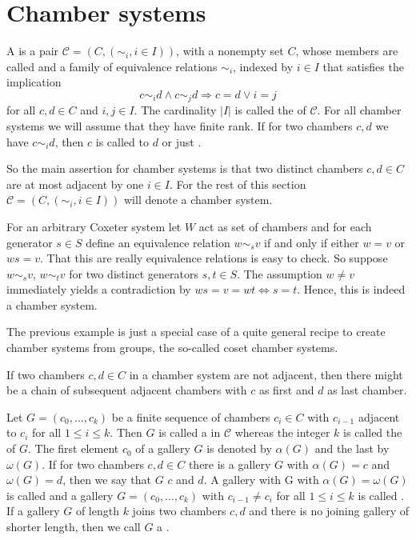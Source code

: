 \section{Chamber systems}

\begin{defi}
	A  is a pair $\mathcal{C} = (C,(\sim_i, i \in I))$, with a nonempty set $C$, whose members are called  and a family of equivalence relations $\sim_i$, indexed by $i \in I$ that satisfies the implication
	$$ c \sim_i d \wedge c \sim_j d \Rightarrow c = d \vee i = j $$
	for all $c,d \in C$ and $i,j \in I$. The cardinality $|I|$ is called the  of $\mathcal{C}$. For all chamber systems we will assume that they have finite rank. If for two chambers $c,d$ we have $c \sim_i d$, then $c$ is called  to $d$ or just .
\end{defi}

So the main assertion for chamber systems is that two distinct chambers $c,d \in C$ are at most adjacent by one $i \in I$. For the rest of this section $\mathcal{C} = (C,(\sim_i, i \in I))$ will denote a chamber system.

\begin{exam}
	For an arbitrary Coxeter system let $W$ act as set of chambers and for each generator $s \in S$ define an equivalence relation $w \sim_s v$ if and only if either $w = v$ or $ws = v$. That this are really equivalence relations is easy to check. So suppose $w \sim_s v$, $w \sim_t v$ for two distinct generators $s,t \in S$. The assumption $w \neq v$ immediately yields a contradiction by $ws = v = wt \iff s = t$. Hence, this is indeed a chamber system.
\end{exam}

The previous example is just a special case of a quite general recipe to create chamber systems from groups, the so-called coset chamber systems.

If two chambers $c,d \in C$ in a chamber system are not adjacent, then there might be a chain of subsequent adjacent chambers with $c$ as first and $d$ as last chamber.

\begin{defi}
	Let $G = (c_0,\ldots,c_k)$ be a finite sequence of chambers $c_i \in C$ with $c_{i-1}$ adjacent to $c_i$ for all $1 \leq i \leq k$. Then $G$ is called a  in $\mathcal{C}$ whereas the integer $k$ is called the  of $G$. The first element $c_0$ of a gallery $G$ is denoted by $\alpha(G)$ and the last by $\omega(G)$. If for two chambers $c,d \in C$ there is a gallery $G$ with $\alpha(G) = c$ and $\omega(G) = d$, then we say that $G$  $c$ and $d$. A gallery with G with $\alpha(G) = \omega(G)$ is called  and a gallery $G = (c_0,\ldots,c_k)$ with $c_{i-1} \neq c_i$ for all $1 \leq i \leq k$ is called . If a gallery $G$ of length $k$ joins two chambers $c,d$ and there is no joining gallery of shorter length, then we call $G$ a .
\end{defi}

